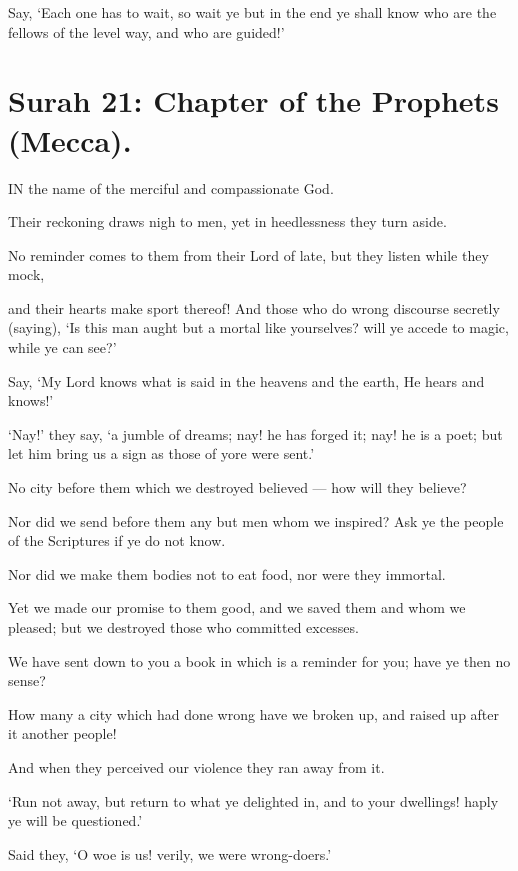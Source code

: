 \documentclass[fontsize=14pt, letterpaper, notitlepage, openany, DIV=12]{scrbook} %
\begin{document}
\noindent[20:135]
Say, `Each one has to wait, so wait ye but in the end ye shall know who are the fellows
of the level way, and who are guided!'


\section{Surah 21: Chapter of the Prophets (Mecca).}


IN the name of the merciful and compassionate God.

\noindent[21:1]
Their reckoning draws nigh to men, yet in heedlessness they turn aside.

\noindent[21:2]
No reminder comes to them from their Lord of late, but they listen while they mock,

\noindent[21:3]
and their hearts make sport thereof! And those who do wrong discourse secretly (saying),
`Is this man aught but a mortal like yourselves? will ye accede to magic, while ye can see?'

\noindent[21:4]
Say, `My Lord knows what is said in the heavens and the earth, He hears and knows!'

\noindent[21:5]
`Nay!' they say, `a jumble of dreams; nay! he has forged it; nay! he is a poet; but let him
bring us a sign as those of yore were sent.'

\noindent[21:6]
No city before them which we destroyed believed --- how will they believe?

\noindent[21:7]
Nor did we send before them any but men whom we inspired? Ask ye the people of the
Scriptures if ye do not know.

\noindent[21:8]
Nor did we make them bodies not to eat food, nor were they immortal.

\noindent[21:9]
Yet we made our promise to them good, and we saved them and whom we pleased; but
we destroyed those who committed excesses.

\noindent[21:10]
We have sent down to you a book in which is a reminder for you; have ye then no sense?

\noindent[21:11]
How many a city which had done wrong have we broken up, and raised up after it
another people!

\noindent[21:12]
And when they perceived our violence they ran away from it.

\noindent[21:13]
`Run not away, but return to what ye delighted in, and to your dwellings! haply ye will be
questioned.'

\noindent[21:14]
Said they, `O woe is us! verily, we were wrong-doers.'
\end{document}
